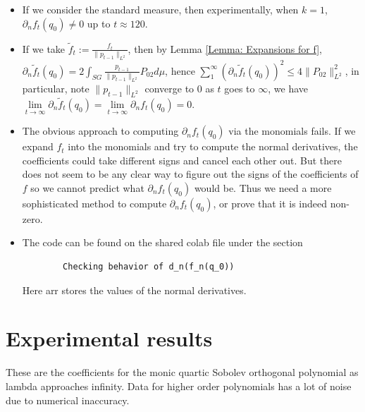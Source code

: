 \documentclass[12pt]{amsart}
\theoremstyle{plain}
\theoremstyle{definition}
\begin{document}
\begin{itemize}
    \item If we consider the standard measure, then experimentally, when $k =1$, $\partial_{n}f_{t}(q_0) \neq 0$ up to $t \approx 120$.
    \item If we take $\widetilde f_t:=\frac{f_t}{\|p_{t-1}\|_{L^2}}$, then by Lemma \ref{Lemma: Expansions for f}, $\partial_n\widetilde f_t(q_0)=2\int_{SG}\frac{p_{t-1}}{\|p_{t-1}\|_{L^2}}P_{02}d\mu$, hence $\sum\limits^{\infty}_1 (\partial_n\widetilde f_t(q_0))^2\le4\|P_{02}\|_{L^2}^2$, in particular, note $\|p_{t-1}\|_{L^2}$ converge to $0$ as $t$ goes to $\infty$, we have $\lim\limits_{t\rightarrow\infty}\partial_n\widetilde f_t(q_0)=\lim\limits_{t\rightarrow\infty}\partial_n f_t(q_0)=0$.
    
    \item The obvious approach to computing $\partial_{n}f_{t}(q_0)$ via the monomials fails. If we expand $f_t$ into the monomials and try to compute the normal derivatives, the coefficients could take different signs and cancel each other out. But there does not seem to be any clear way to figure out the signs of the coefficients of $f$ so we cannot predict what $\partial_{n}f_{t}(q_0)$ would be. Thus we need a more sophisticated method to compute $\partial_{n}f_{t}(q_0)$, or prove that it is indeed non-zero. 
    \item The code can be found on the shared colab file under the section \begin{verbatim}
        Checking behavior of d_n(f_n(q_0))
    \end{verbatim}
    Here arr stores the values of the normal derivatives. 
\end{itemize}

\section{Experimental results}

These are the coefficients for the monic quartic Sobolev orthogonal polynomial as lambda approaches infinity. Data for higher order polynomials has a lot of noise due to numerical inaccuracy. 
\end{document}
